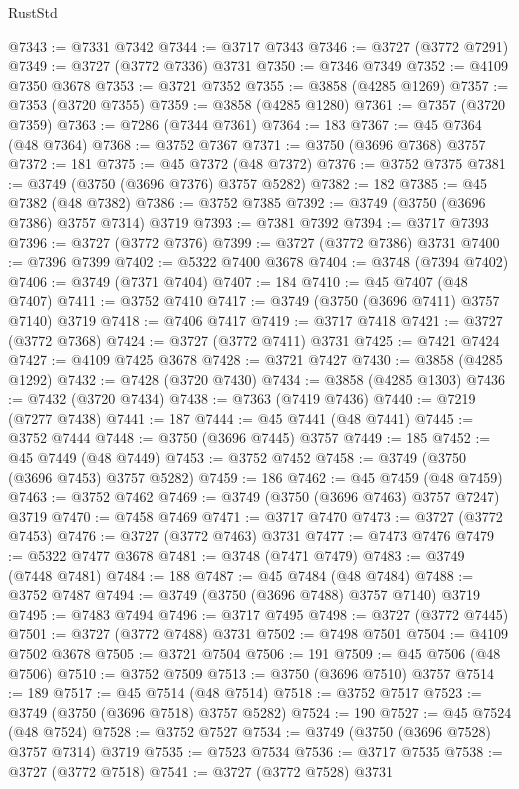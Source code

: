 \begin{lexlean}{RustStd}
\begin{coremodule}
@7343 := @7331 @7342
@7344 := @3717 @7343
@7346 := @3727 (@3772 @7291)
@7349 := @3727 (@3772 @7336) @3731
@7350 := @7346 @7349
@7352 := @4109 @7350 @3678
@7353 := @3721 @7352
@7355 := @3858 (@4285 @1269)
@7357 := @7353 (@3720 @7355)
@7359 := @3858 (@4285 @1280)
@7361 := @7357 (@3720 @7359)
@7363 := @7286 (@7344 @7361)
@7364 := 183
@7367 := @45 @7364 (@48 @7364)
@7368 := @3752 @7367
@7371 := @3750 (@3696 @7368) @3757
@7372 := 181
@7375 := @45 @7372 (@48 @7372)
@7376 := @3752 @7375
@7381 := @3749 (@3750 (@3696 @7376) @3757 @5282)
@7382 := 182
@7385 := @45 @7382 (@48 @7382)
@7386 := @3752 @7385
@7392 := @3749 (@3750 (@3696 @7386) @3757 @7314) @3719
@7393 := @7381 @7392
@7394 := @3717 @7393
@7396 := @3727 (@3772 @7376)
@7399 := @3727 (@3772 @7386) @3731
@7400 := @7396 @7399
@7402 := @5322 @7400 @3678
@7404 := @3748 (@7394 @7402)
@7406 := @3749 (@7371 @7404)
@7407 := 184
@7410 := @45 @7407 (@48 @7407)
@7411 := @3752 @7410
@7417 := @3749 (@3750 (@3696 @7411) @3757 @7140) @3719
@7418 := @7406 @7417
@7419 := @3717 @7418
@7421 := @3727 (@3772 @7368)
@7424 := @3727 (@3772 @7411) @3731
@7425 := @7421 @7424
@7427 := @4109 @7425 @3678
@7428 := @3721 @7427
@7430 := @3858 (@4285 @1292)
@7432 := @7428 (@3720 @7430)
@7434 := @3858 (@4285 @1303)
@7436 := @7432 (@3720 @7434)
@7438 := @7363 (@7419 @7436)
@7440 := @7219 (@7277 @7438)
@7441 := 187
@7444 := @45 @7441 (@48 @7441)
@7445 := @3752 @7444
@7448 := @3750 (@3696 @7445) @3757
@7449 := 185
@7452 := @45 @7449 (@48 @7449)
@7453 := @3752 @7452
@7458 := @3749 (@3750 (@3696 @7453) @3757 @5282)
@7459 := 186
@7462 := @45 @7459 (@48 @7459)
@7463 := @3752 @7462
@7469 := @3749 (@3750 (@3696 @7463) @3757 @7247) @3719
@7470 := @7458 @7469
@7471 := @3717 @7470
@7473 := @3727 (@3772 @7453)
@7476 := @3727 (@3772 @7463) @3731
@7477 := @7473 @7476
@7479 := @5322 @7477 @3678
@7481 := @3748 (@7471 @7479)
@7483 := @3749 (@7448 @7481)
@7484 := 188
@7487 := @45 @7484 (@48 @7484)
@7488 := @3752 @7487
@7494 := @3749 (@3750 (@3696 @7488) @3757 @7140) @3719
@7495 := @7483 @7494
@7496 := @3717 @7495
@7498 := @3727 (@3772 @7445)
@7501 := @3727 (@3772 @7488) @3731
@7502 := @7498 @7501
@7504 := @4109 @7502 @3678
@7505 := @3721 @7504
@7506 := 191
@7509 := @45 @7506 (@48 @7506)
@7510 := @3752 @7509
@7513 := @3750 (@3696 @7510) @3757
@7514 := 189
@7517 := @45 @7514 (@48 @7514)
@7518 := @3752 @7517
@7523 := @3749 (@3750 (@3696 @7518) @3757 @5282)
@7524 := 190
@7527 := @45 @7524 (@48 @7524)
@7528 := @3752 @7527
@7534 := @3749 (@3750 (@3696 @7528) @3757 @7314) @3719
@7535 := @7523 @7534
@7536 := @3717 @7535
@7538 := @3727 (@3772 @7518)
@7541 := @3727 (@3772 @7528) @3731

\end{coremodule}
\end{lexlean}
